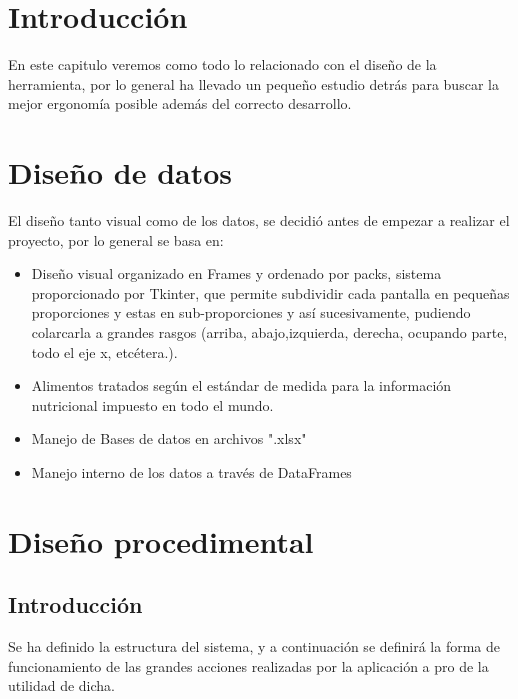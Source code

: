 
\section{Introducción}
En este capitulo veremos como todo lo relacionado con el diseño de la herramienta, por lo general ha llevado un pequeño estudio detrás para buscar la mejor ergonomía posible además del correcto desarrollo.
\section{Diseño de datos}
El diseño tanto visual como de los datos, se decidió antes de empezar a realizar el proyecto, por lo general se basa en:
\begin{itemize}
\item Diseño visual organizado en Frames y ordenado por packs, sistema proporcionado por Tkinter, que permite subdividir cada pantalla en pequeñas proporciones y estas en sub-proporciones y así sucesivamente, pudiendo colarcarla a grandes rasgos (arriba, abajo,izquierda, derecha, ocupando parte, todo el eje x, etcétera.).
\item Alimentos tratados según el estándar de medida para la información nutricional impuesto en todo el mundo.
\item Manejo de Bases de datos en archivos ".xlsx"
\item Manejo interno de los datos a través de DataFrames
\end{itemize}
\section{Diseño procedimental}
\subsection{Introducción}
Se ha definido la estructura del sistema, y a continuación se definirá la forma de funcionamiento de las grandes acciones realizadas por la aplicación a pro de la utilidad de dicha.
